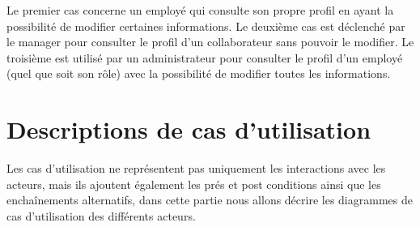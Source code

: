 Le premier cas concerne un employé qui consulte son propre profil en ayant la possibilité de modifier certaines informations. Le deuxième cas est déclenché par le manager pour consulter le profil d’un collaborateur sans pouvoir le modifier. Le troisième est utilisé par un administrateur pour consulter le profil d’un employé (quel que soit son rôle) avec la possibilité de modifier toutes les informations. 


\section{Descriptions de cas d'utilisation}
Les cas d’utilisation ne représentent pas uniquement les interactions avec les acteurs, mais ils ajoutent également les prés et post conditions ainsi que les enchaînements alternatifs, dans cette partie nous allons décrire les diagrammes de cas d’utilisation des différents acteurs.
    
        
